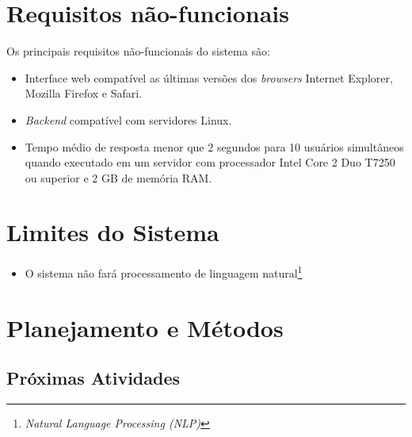 \section{Requisitos não-funcionais}

Os principais requisitos não-funcionais do sistema são:

\begin{itemize}

    \item Interface web compatível as últimas versões dos \textit{browsers} Internet Explorer, Mozilla Firefox e Safari.
    
    \item \textit{Backend} compatível com servidores Linux.

    \item Tempo médio de resposta menor que 2 segundos para 10 usuários simultâneos quando executado em um servidor com processador Intel Core 2 Duo T7250 ou superior e 2 GB de memória RAM. %

\end{itemize}

\section{Limites do Sistema}

\begin{itemize}
  
    \item O sistema não fará processamento de linguagem natural\footnote{\textit{Natural Language Processing (NLP)}}

\end{itemize}



\section{Planejamento e Métodos} %
\label{sec:planejamento_e_métodos}


\subsection{Próximas Atividades} %
\label{sub:próximas_atividades}

